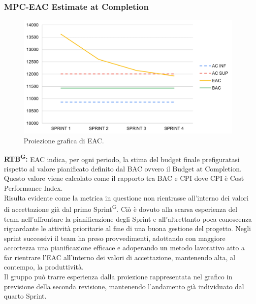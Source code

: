 \documentclass[8pt]{article}
\newcommand{\glossterm}[1]{#1\textsuperscript{G}} %
\begin{document}
\subsubsection{MPC-EAC Estimate at Completion}
\begin{figure}[h!]
    \centering
    \includegraphics[width=1\textwidth]{images/EAC.png}
    \caption{Proiezione grafica di EAC.}
    \label{fig:Proiezione grafica di EAC}
\end{figure}
\textbf{\glossterm{RTB}:} EAC indica, per ogni periodo, la stima del budget finale prefiguratasi rispetto al valore pianificato definito dal BAC ovvero il Budget at Completion. Questo valore viene calcolato come il rapporto tra BAC e CPI dove CPI è Cost Performance Index.\\
Risulta evidente come la metrica in questione non rientrasse all'interno dei valori di accettazione già dal primo \glossterm{Sprint}. Ciò è dovuto alla scarsa esperienza del team nell'affrontare la pianificazione degli Sprint e all'altrettanto poca conoscenza riguardante le attività prioritarie al fine di una buona gestione del progetto. Negli sprint successivi il team ha preso provvedimenti, adottando con maggiore accortezza una pianificazione efficace e adoperando un metodo lavorativo atto a far rientrare l'EAC all'interno dei valori di accettazione, mantenendo alta, al contempo, la produttività.\\
Il gruppo può trarre esperienza dalla proiezione rappresentata nel grafico in previsione della seconda revisione, mantenendo l'andamento già individuato dal quarto Sprint.
\clearpage
\end{document}
